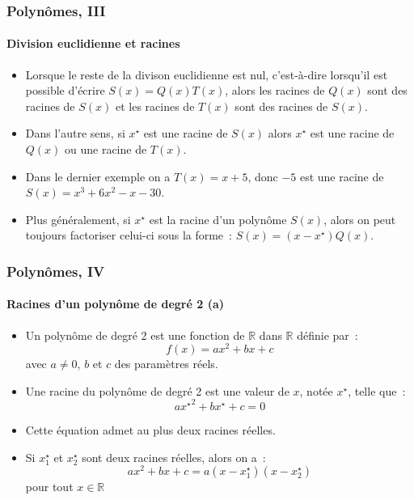 \documentclass[10pt,notheorems]{beamer}
\theoremstyle{plain}
\theoremstyle{definition} %
\begin{document}
\begin{frame}
  \frametitle{Polynômes, III}
  \framesubtitle{Division euclidienne et racines}
  \hypertarget{slide_division_racine}{}

  \bigskip

  \begin{itemize}

  \item Lorsque le reste de la divison euclidienne est nul, c'est-à-dire lorsqu'il est possible d'écrire $S(x)=Q(x)T(x)$, alors les racines de $Q(x)$ sont des racines de $S(x)$ et les racines de $T(x)$ sont des racines de $S(x)$.\newline

  \item Dans l'autre sens, si $x^{\star}$ est une racine de $S(x)$ alors $x^{\star}$ est une racine de $Q(x)$ ou une racine de $T(x)$.\newline

  \item Dans le dernier exemple on a $T(x)=x+5$, donc $-5$ est une racine de $S(x)=x^3+6x^2-x-30$.\newline

  \item Plus généralement, si $x^{\star}$ est la racine d'un polynôme $S(x)$, alors on peut toujours factoriser celui-ci sous la forme~: $S(x) = (x-x^{\star}) Q(x)$.
  \end{itemize}

\end{frame}


\begin{frame}
  \frametitle{Polynômes, IV}
  \framesubtitle{Racines d'un polynôme de degré 2 (a)}
  \hypertarget{slide_polynome_2_racines_1}{}

  \bigskip

  \begin{itemize}

  \item Un polynôme de degré 2 est une fonction de $\mathbb R$ dans $\mathbb R$ définie par~:
    \[
      f(x) = ax^2 + bx + c
    \]
    avec $a\neq 0$, $b$ et $c$ des paramètres réels.\newline

  \item Une racine du polynôme de degré 2 est une valeur de $x$, notée $x^{\star}$, telle que~:
    \[
      a \left.x^{\star}\right.^2 + b x^{\star} + c = 0
    \]

    \bigskip

  \item Cette équation admet au plus deux racines réelles.\newline

  \item Si $x_1^{\star}$ et $x_2^{\star}$ sont deux racines réelles, alors on a~:
    \[
      a x^2 + b x + c = a(x-x_1^{\star})(x-x_2^{\star})
    \]
    pour tout $x\in\mathbb R$

  \end{itemize}

\end{frame}
\end{document}
